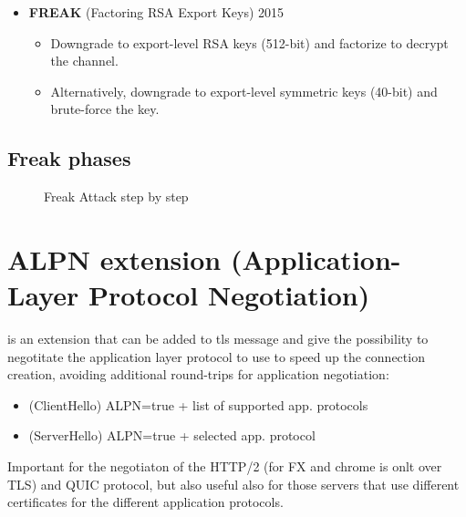 \begin{itemize}
    \item \textbf{FREAK} (Factoring RSA Export Keys) 2015
    \begin{itemize}
        \item Downgrade to export-level RSA keys (512-bit) and factorize to decrypt the channel.
        \item Alternatively, downgrade to export-level symmetric keys (40-bit) and brute-force the key.
    \end{itemize}
\end{itemize}

\subsection{Freak phases}

\begin{figure}[htbp]
    \centering
    \hfill
    \caption{Freak Attack step by step}
    \label{fig:freak}
\end{figure}


\section{ALPN extension (Application-Layer Protocol Negotiation)}

is an extension that can be added to tls message and give the possibility to negotitate the application layer protocol to use to speed up the connection creation, avoiding additional round-trips for application negotiation: \\
\begin{itemize}
    \item (ClientHello) ALPN=true + list of supported app. protocols
    \item (ServerHello) ALPN=true + selected app. protocol
\end{itemize}
Important for the negotiaton of the HTTP/2 (for FX and chrome is onlt over TLS) and QUIC protocol, but also useful also for those servers that use different certificates for the different application protocols. \\

